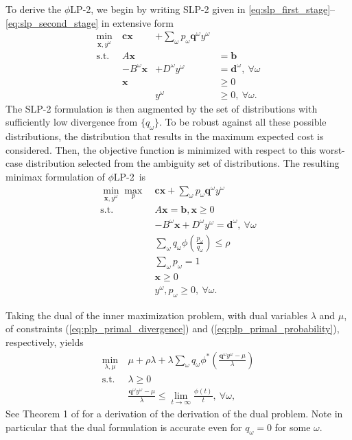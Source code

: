\documentclass[11pt]{article}
\newcommand{\x}{\mathbf{x}}
\renewcommand{\c}{\mathbf{c}}
\newcommand{\q}{\mathbf{q}}
\renewcommand{\b}{\mathbf{b}}
\renewcommand{\d}{\mathbf{d}}
\newcommand{\st}{\mbox{s.t.}}
\newcommand{\plp}{$\phi$LP-2}
\begin{document}
To derive the \plp, we begin by writing SLP-2 given in \eqref{eq:slp_first_stage}--\eqref{eq:slp_second_stage} in extensive form
\[
	\begin{array}{rrrl}
		\min_{\x,y^\omega} \ & \c\x & + \sum_\omega p_\omega \q^\omega y^\omega \label{eq:slp2cost} \\
		\st \ & A\x & & = \b \nonumber \\
		& -B^\omega \x & + D^\omega y^\omega & = \d^\omega,\ \forall \omega \nonumber \\
		& \x & & \geq 0 \nonumber \\
		& & y^\omega & \geq 0,\ \forall \omega. \nonumber
	\end{array}
\]
The SLP-2 formulation is then augmented by the set of distributions with sufficiently low divergence from $\{q_\omega\}$.
To be robust against all these possible distributions, the distribution that results in the maximum expected cost is considered.
Then, the objective function is minimized with respect to this worst-case distribution selected from the ambiguity set of distributions.
The resulting minimax formulation of \plp\ is
\begin{align}
	\min_{\x,y^\omega} \max_p \ & \c\x + \sum_\omega p_\omega \q^\omega y^\omega \label{eq:plp_primal}\\
	\st \ & A\x = \b, \x \geq 0 \nonumber \\
	& -B^\omega \x + D^\omega y^\omega = \d^\omega,\ \forall \omega \nonumber \\
	& \sum_\omega q_\omega \phi\left(\frac{p_\omega}{q_\omega}\right) \leq \rho \label{eq:plp_primal_divergence} \\
	& \sum_\omega p_\omega = 1 \label{eq:plp_primal_probability} \\
	& \x \geq 0 \nonumber \\
	& y^\omega, p_\omega \geq 0,\ \forall \omega. \label{eq:nonneg}
\end{align}

Taking the dual of the inner maximization problem, with dual variables $\lambda$ and $\mu$, of constraints (\ref{eq:plp_primal_divergence}) and (\ref{eq:plp_primal_probability}), respectively, yields
\begin{align*}
	\min_{\lambda,\mu} \ & \mu + \rho \lambda + \lambda \sum_\omega q_\omega \phi^*\left(\frac{\q^\omega y^\omega - \mu}{\lambda}\right) \\
	\st \ & \lambda \geq 0 \\
	& \frac{\q^\omega y^\omega - \mu}{\lambda} \leq \lim_{t \rightarrow \infty} \frac{\phi(t)}{t}, \ \forall \omega,
\end{align*}
See Theorem 1 of \cite{bental2011robust} for a derivation of the derivation of the dual problem.
Note in particular that the dual formulation is accurate even for $q_\omega = 0$ for some $\omega$.
\end{document}
